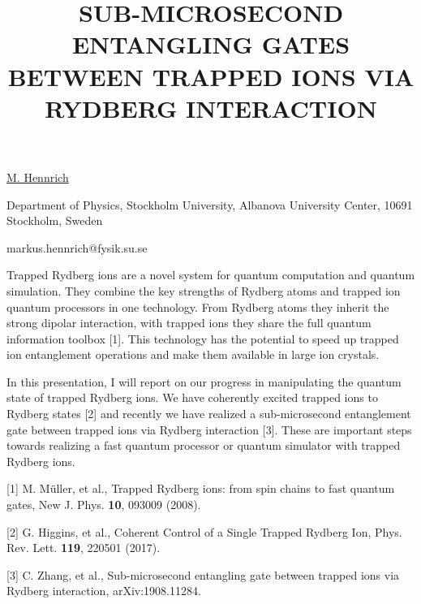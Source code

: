 \title{SUB-MICROSECOND ENTANGLING GATES BETWEEN TRAPPED IONS VIA RYDBERG INTERACTION}

\underline{M. Hennrich} 

{\normalsize{\vspace{-4mm}
Department of Physics, Stockholm University,
Albanova University Center,
10691 Stockholm,
Sweden



\email markus.hennrich@fysik.su.se}}

Trapped Rydberg ions are a novel system for quantum computation and quantum simulation. They combine the key strengths of Rydberg atoms and trapped ion quantum processors in one technology. From Rydberg atoms they inherit the strong dipolar interaction, with trapped ions they share the full quantum information toolbox [1]. This technology has the potential to speed up trapped ion entanglement operations and make them available in large ion crystals.

In this presentation, I will report on our progress in manipulating the quantum state of trapped Rydberg ions. We have coherently excited trapped ions to Rydberg states [2] and recently we have realized a sub-microsecond entanglement gate between trapped ions via Rydberg interaction [3]. These are important steps towards realizing a fast quantum processor or quantum simulator with trapped Rydberg ions.

{\normalsize
[1] M. M\"uller, et al., Trapped Rydberg ions: from spin chains to fast quantum gates, New J. Phys. \textbf{10}, 093009 (2008).
\vsp

[2] G. Higgins, et al., Coherent Control of a Single Trapped Rydberg Ion, Phys. Rev. Lett. \textbf{119}, 220501 (2017).
\vsp

[3] C. Zhang, et al., Sub-microsecond entangling gate between trapped ions via Rydberg interaction, arXiv:1908.11284.
}

\vspace{\baselineskip}